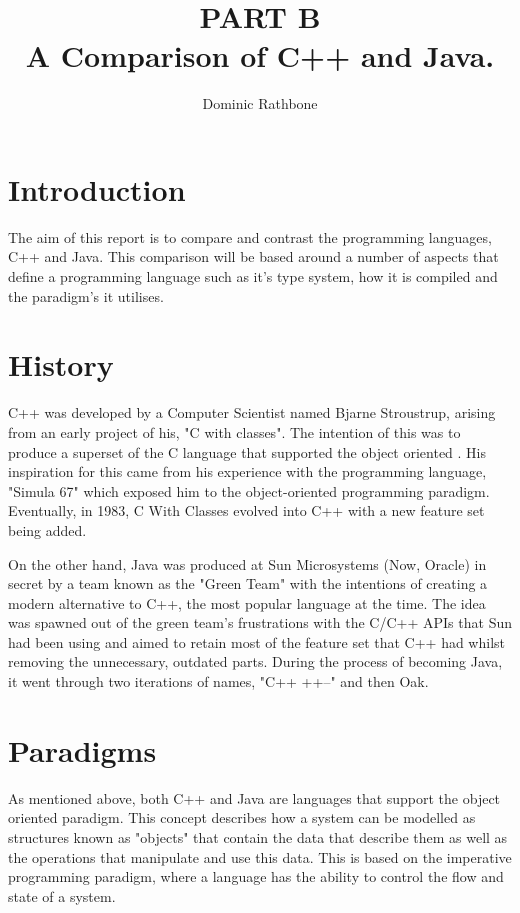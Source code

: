 \documentclass[]{report}
\title{PART B \\ A Comparison of C++ and Java.}
\author{Dominic Rathbone}
\begin{document}
\maketitle
\section{Introduction}
The aim of this report is to compare and contrast the programming languages, C++ and Java. This comparison will be based around a number of aspects that define a programming language such as it's type system, how it is compiled and the paradigm's it utilises.

\section{History}
C++ was developed by a Computer Scientist named Bjarne Stroustrup, arising from an early project of his, "C with classes". The intention of this was to produce a superset of the C language that supported the object oriented . His inspiration for this came from his experience with the programming language, "Simula 67" which exposed him to the object-oriented programming paradigm. Eventually, in 1983, C With Classes evolved into C++ with a new feature set being added. \cite{HistoryC++}

On the other hand, Java was produced at Sun Microsystems (Now, Oracle) in secret by a team known as the "Green Team" with the intentions of creating a modern alternative to C++, the most popular language at the time. The idea was spawned out of the green team's frustrations with the C/C++ APIs that Sun had been using and aimed to retain most of the feature set that C++ had whilst removing the unnecessary, outdated parts. During the process of becoming Java, it went through two iterations of names, "C++ ++--" and then Oak.\cite{HistoryJava}

\section{Paradigms}
As mentioned above, both C++ and Java are languages that support the object oriented paradigm. This concept describes how a system can be modelled as structures known as "objects" that contain the data that describe them as well as the operations that manipulate and use this data. This is based on the imperative programming paradigm, where a language has the ability to control the flow and state of a system. \cite{Paradigms}
\end{document}
